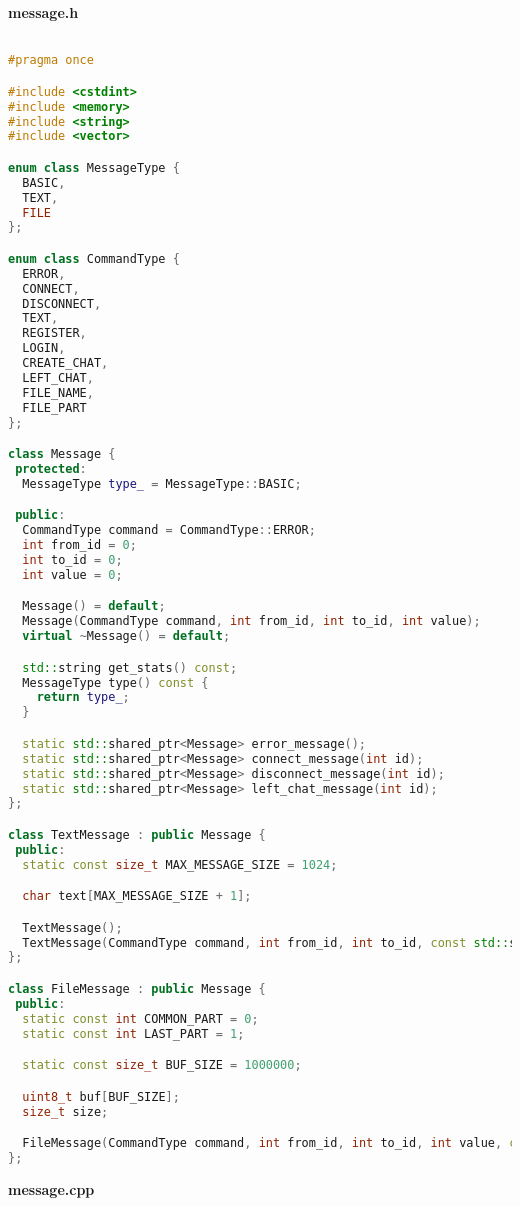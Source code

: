 \textbf{message.h}

\begin{lstlisting}[language=C++]

#pragma once

#include <cstdint>
#include <memory>
#include <string>
#include <vector>

enum class MessageType {
  BASIC,
  TEXT,
  FILE
};

enum class CommandType {
  ERROR,
  CONNECT,
  DISCONNECT,
  TEXT,
  REGISTER,
  LOGIN,
  CREATE_CHAT,
  LEFT_CHAT,
  FILE_NAME,
  FILE_PART
};

class Message {
 protected:
  MessageType type_ = MessageType::BASIC;

 public:
  CommandType command = CommandType::ERROR;
  int from_id = 0;
  int to_id = 0;
  int value = 0;

  Message() = default;
  Message(CommandType command, int from_id, int to_id, int value);
  virtual ~Message() = default;

  std::string get_stats() const;
  MessageType type() const {
    return type_;
  }

  static std::shared_ptr<Message> error_message();
  static std::shared_ptr<Message> connect_message(int id);
  static std::shared_ptr<Message> disconnect_message(int id);
  static std::shared_ptr<Message> left_chat_message(int id);
};

class TextMessage : public Message {
 public:
  static const size_t MAX_MESSAGE_SIZE = 1024;

  char text[MAX_MESSAGE_SIZE + 1];

  TextMessage();
  TextMessage(CommandType command, int from_id, int to_id, const std::string& text, int value = 0);
};

class FileMessage : public Message {
 public:
  static const int COMMON_PART = 0;
  static const int LAST_PART = 1;

  static const size_t BUF_SIZE = 1000000;

  uint8_t buf[BUF_SIZE];
  size_t size;

  FileMessage(CommandType command, int from_id, int to_id, int value, const std::vector<uint8_t>& buf_vec);
};

\end{lstlisting}

\textbf{message.cpp}

